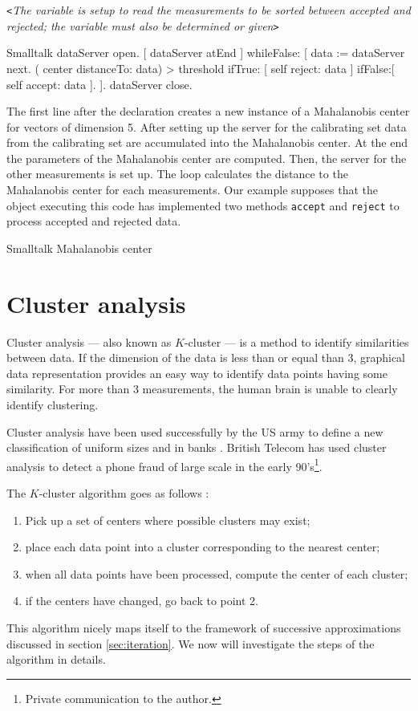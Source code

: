 \noindent\texttt{<}\textsl{The variable  is setup to read
the measurements to be sorted between accepted and rejected; the
variable  must also be determined or given}\texttt{>}

\begin{listing}{Smalltalk}
  { }
  dataServer open.
 [ dataServer atEnd ]
      whileFalse: [ data := dataServer next.
                    ( center distanceTo: data) > threshold
                        ifTrue: [ self reject: data ]
                        ifFalse:[ self accept: data ].
                  ].
 dataServer close.
\end{listing}

The first line after the declaration creates a new instance of a
Mahalanobis center for vectors of dimension 5. After setting up
the server for the calibrating set data from the calibrating set
are accumulated into the Mahalanobis center. At the end the
parameters of the Mahalanobis center are computed. Then, the
server for the other measurements is set up. The loop calculates
the distance to the Mahalanobis center for each measurements. Our
example supposes that the object executing this code has
implemented two methods \texttt{accept} and \texttt{reject} to process
accepted and rejected data.

\begin{listing} Smalltalk Mahalanobis center  \label{ls:mahalanobis}

\end{listing}

\section{Cluster analysis}
\label{sec:cluster} Cluster analysis --- also known as $K$-cluster
--- is a method to identify similarities between data. If the
dimension of the data is less than or equal than 3, graphical data
representation provides an easy way to identify data points having
some similarity. For more than 3 measurements, the human brain is
unable to clearly identify clustering.

Cluster analysis have been used successfully by the US army to
define a new classification of uniform sizes and in banks
\cite{BerLin}. British Telecom has used cluster analysis to detect
a phone fraud of large scale in the early 90's\footnote{Private
communication to the author.}.

\noindent The $K$-cluster algorithm goes as follows \cite{BerLin}:
\begin{enumerate}
  \item Pick up a set of centers where possible clusters may
  exist;
  \item place each data point into a cluster corresponding to the
  nearest center;
  \item when all data points have been processed, compute the
  center of each cluster;
  \item if the centers have changed, go back to point 2.
\end{enumerate}
This algorithm nicely maps itself to the framework of successive
approximations discussed in section \ref{sec:iteration}. We now
will investigate the steps of the algorithm in details.

